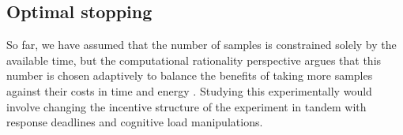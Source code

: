 

\subsection{Optimal stopping}
\label{sec:MCMC_optimal_stop}

So far, we have assumed that the number of samples is constrained solely by the available time, but the computational rationality perspective argues that this number is chosen adaptively to balance the benefits of taking more samples against their costs in time and energy \citep{Gershman2015,Vul2014,griffiths2015}. Studying this experimentally would involve changing the incentive structure of the experiment in tandem with response deadlines and cognitive load manipulations.

